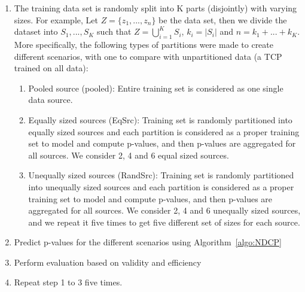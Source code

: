 \documentclass[main]{subfiles}
\begin{document}
\begin{enumerate}

\item The training data set is randomly split into K parts (disjointly) with varying sizes. For example, Let $Z = \{ z_1 , ..., z_n \} $ be the data set, then we divide the dataset into $S_1, ..., S_K$ such that $Z = \bigcup_{i=1}^K S_i$, $k_i = |S_i|$ and $n = k_1+ ...+k_K$. More specifically, the following types of partitions were made to create different scenarios, with one to compare with unpartitioned data (a TCP trained on all data):

\begin{enumerate}
	\item Pooled source (pooled): Entire training set is considered as one single data source.
	\item Equally sized sources (EqSrc): Training set is randomly partitioned into equally sized sources and  each partition is considered as a proper training set to model and compute p-values, and then p-values are aggregated for all sources. We consider 2, 4 and 6 equal sized sources. %
	\item Unequally sized sources (RandSrc): Training set is randomly partitioned into unequally sized sources and  each partition is considered as a proper training set to model and compute p-values, and then p-values are aggregated for all sources. We consider 2, 4 and 6 unequally sized sources, and we repeat it five times to get five different set of sizes for each source.

\end{enumerate}


\item Predict p-values for the different scenarios using Algorithm~\ref{algo:NDCP}

\item Perform evaluation based on validity and efficiency

\item Repeat step 1 to 3  five times.


\end{enumerate}


%
\end{document}
